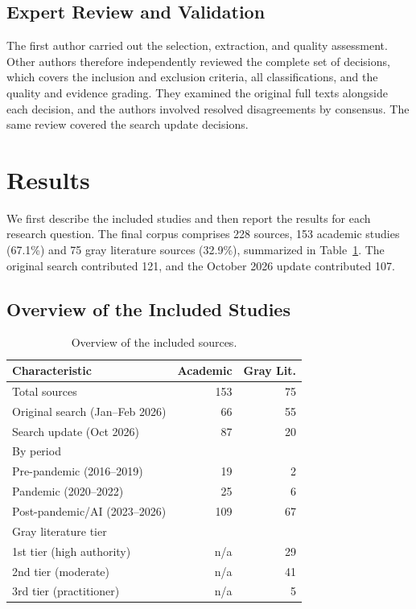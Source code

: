 \documentclass[preprint,number]{elsarticle}
\begin{document}
\subsection{Expert Review and Validation}
\label{sec:second-reviewer}
The first author carried out the selection, extraction, and quality assessment. Other authors therefore independently reviewed the complete set of decisions, which covers the inclusion and exclusion criteria, all classifications, and the quality and evidence grading. They examined the original full texts alongside each decision, and the authors involved resolved disagreements by consensus. The same review covered the search update decisions.


\section{Results}
\label{sec:results}

We first describe the included studies and then report the results for each research question. The final corpus comprises 228 sources, 153 academic studies (67.1\%) and 75 gray literature sources (32.9\%), summarized in Table~\ref{tab:overview}. The original search contributed 121, and the October 2026 update contributed 107.

\subsection{Overview of the Included Studies}
\label{sec:overview}

\begin{table}[htbp]
\centering
\caption{Overview of the included sources.}
\label{tab:overview}
\footnotesize
\begin{tabular}{l r r}
\toprule
\textbf{Characteristic} & \textbf{Academic} & \textbf{Gray Lit.} \\
\midrule
\rowcolor{lightgray}
Total sources & 153 & 75 \\
\quad Original search (Jan--Feb 2026) & 66 & 55 \\
\quad Search update (Oct 2026) & 87 & 20 \\
By period & & \\
\quad Pre-pandemic (2016--2019) & 19 & 2 \\
\quad Pandemic (2020--2022) & 25 & 6 \\
\quad Post-pandemic/AI (2023--2026) & 109 & 67 \\
\rowcolor{lightgray}
Gray literature tier & & \\
\quad 1st tier (high authority) & n/a & 29 \\
\quad 2nd tier (moderate) & n/a & 41 \\
\quad 3rd tier (practitioner) & n/a & 5 \\
\bottomrule
\end{tabular}
\end{table}
\end{document}
